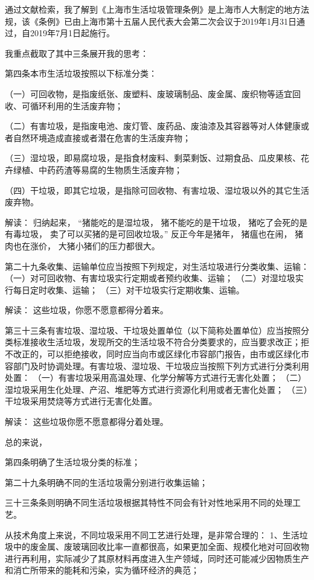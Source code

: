 \documentclass[
]{book}
\begin{document}
通过文献检索，我了解到《上海市生活垃圾管理条例》是上海市人大制定的地方法规，该《条例》已由上海市第十五届人民代表大会第二次会议于2019年1月31日通过，自2019年7月1日起施行。

我重点截取了其中三条展开我的思考：

第四条本市生活垃圾按照以下标准分类：

（一）可回收物，是指废纸张、废塑料、废玻璃制品、废金属、废织物等适宜回收、可循环利用的生活废弃物；

（二）有害垃圾，是指废电池、废灯管、废药品、废油漆及其容器等对人体健康或者自然环境造成直接或者潜在危害的生活废弃物；

（三）湿垃圾，即易腐垃圾，是指食材废料、剩菜剩饭、过期食品、瓜皮果核、花卉绿植、中药药渣等易腐的生物质生活废弃物；

（四）干垃圾，即其它垃圾，是指除可回收物、有害垃圾、湿垃圾以外的其它生活废弃物。

解读：
归纳起来，
``猪能吃的是湿垃圾，
猪不能吃的是干垃圾，
猪吃了会死的是有毒垃圾，
卖了可以买猪的是可回收垃圾。''
反正今年是猪年，
猪瘟也在闹，
猪肉也在涨价，
大猪小猪们的压力都很大。

第二十九条收集、运输单位应当按照下列规定，对生活垃圾进行分类收集、运输：
（一）对可回收物、有害垃圾实行定期或者预约收集、运输；
（二）对湿垃圾实行每日定时收集、运输；
（三）对干垃圾实行定期收集、运输。

解读：
这些垃圾，你愿不愿意都得分着来。

第三十三条有害垃圾、湿垃圾、干垃圾处置单位（以下简称处置单位）应当按照分类标准接收生活垃圾，发现所交的生活垃圾不符合分类要求的，应当要求改正；拒不改正的，可以拒绝接收，同时应当向市或区绿化市容部门报告，由市或区绿化市容部门及时协调处理。有害垃圾、湿垃圾、干垃圾应当按照下列方式进行分类利用处置：
（一）有害垃圾采用高温处理、化学分解等方式进行无害化处置；
（二）湿垃圾采用生化处理、产沼、堆肥等方式进行资源化利用或者无害化处置；
（三）干垃圾采用焚烧等方式进行无害化处置。

解读：
这些垃圾你愿不愿意都得分着处理。

总的来说，

第四条明确了生活垃圾分类的标准；

第二十九条明确不同的生活垃圾需分别进行收集运输；

三十三条条则明确不同生活垃圾根据其特性不同会有针对性地采用不同的处理工艺。

从技术角度上来说，不同垃圾采用不同工艺进行处理，是非常合理的：
1、生活垃圾中的废金属、废玻璃回收比率一直都很高，如果更加全面、规模化地对可回收物进行再利用，实际减少了其原材料再度进入生产领域，同时还可能减少因物质生产和消亡所带来的能耗和污染，实为循环经济的典范；
\end{document}
